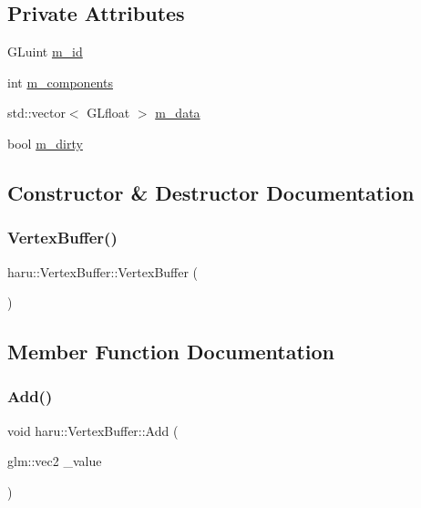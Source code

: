 \subsection*{Private Attributes}
\begin{DoxyCompactItemize}
\item 
G\+Luint \mbox{\hyperlink{classharu_1_1_vertex_buffer_a63aad09771ce7a6722d56e56c0e09922}{m\+\_\+id}}
\item 
int \mbox{\hyperlink{classharu_1_1_vertex_buffer_ab606ca1fca949eb662749ac4986fc638}{m\+\_\+components}}
\item 
std\+::vector$<$ G\+Lfloat $>$ \mbox{\hyperlink{classharu_1_1_vertex_buffer_a0e1dd6e128d66ccb719c7efec8afcc19}{m\+\_\+data}}
\item 
bool \mbox{\hyperlink{classharu_1_1_vertex_buffer_a42cc7fd939921990cad71e1e3856725c}{m\+\_\+dirty}}
\end{DoxyCompactItemize}


\subsection{Constructor \& Destructor Documentation}
\mbox{\label{classharu_1_1_vertex_buffer_a97d2aa926c9d0f52e23687a7f283744f}} 
\subsubsection{\texorpdfstring{Vertex\+Buffer()}{VertexBuffer()}}
{\footnotesize\ttfamily haru\+::\+Vertex\+Buffer\+::\+Vertex\+Buffer (\begin{DoxyParamCaption}{ }\end{DoxyParamCaption})}



\subsection{Member Function Documentation}
\mbox{\label{classharu_1_1_vertex_buffer_a5342e907f32b100831c4380086ecbd32}} 
\subsubsection{\texorpdfstring{Add()}{Add()}\hspace{0.1cm}{\footnotesize\ttfamily [1/3]}}
{\footnotesize\ttfamily void haru\+::\+Vertex\+Buffer\+::\+Add (\begin{DoxyParamCaption}\item[{glm\+::vec2}]{\+\_\+value }\end{DoxyParamCaption})}

